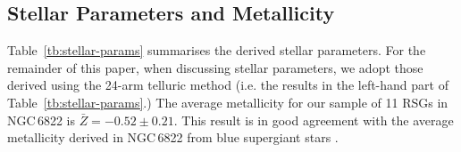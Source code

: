 \documentclass[iop]{emulateapj}
\def\pp{$\phantom{-}$}
\def\o{$\phantom{0}$}
\begin{document}
\begin{table*}
\begin{center}
\begin{tabular}{lc cccc c cccc}


  \hline
  \end{tabular}
  \end{center}
\end{table*}

\subsection{Stellar Parameters and Metallicity} %
\label{sub:stellar_parameters_and_metallicity}

Table~\ref{tb:stellar-params} summarises the derived stellar parameters.
For the remainder of this paper, when discussing stellar parameters,
we adopt those derived using the 24-arm telluric method
(i.e. the results in the left-hand part of Table~\ref{tb:stellar-params}.)
The average metallicity for our sample of 11 RSGs in NGC\,6822 is
$\bar{Z} = -0.52\pm 0.21$.
This result is in good agreement with the average metallicity derived in
NGC\,6822 from blue supergiant stars
\citep[BSGs;][]{1999A&A...352L..40M,2001ApJ...547..765V}.
\end{document}

